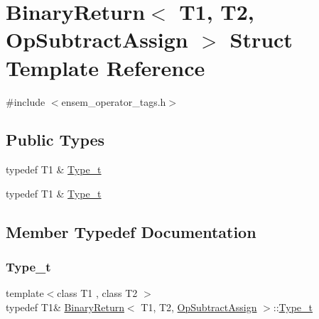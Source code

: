 \hypertarget{structBinaryReturn_3_01T1_00_01T2_00_01OpSubtractAssign_01_4}{}\section{Binary\+Return$<$ T1, T2, Op\+Subtract\+Assign $>$ Struct Template Reference}
\label{structBinaryReturn_3_01T1_00_01T2_00_01OpSubtractAssign_01_4}


{\ttfamily \#include $<$ensem\+\_\+operator\+\_\+tags.\+h$>$}

\subsection*{Public Types}
\begin{DoxyCompactItemize}
\item 
typedef T1 \& \mbox{\hyperlink{structBinaryReturn_3_01T1_00_01T2_00_01OpSubtractAssign_01_4_a93357e4d56f953a4f58fec3320ba9db3}{Type\+\_\+t}}
\item 
typedef T1 \& \mbox{\hyperlink{structBinaryReturn_3_01T1_00_01T2_00_01OpSubtractAssign_01_4_a93357e4d56f953a4f58fec3320ba9db3}{Type\+\_\+t}}
\end{DoxyCompactItemize}


\subsection{Member Typedef Documentation}
\mbox{\label{structBinaryReturn_3_01T1_00_01T2_00_01OpSubtractAssign_01_4_a93357e4d56f953a4f58fec3320ba9db3}} 
\subsubsection{\texorpdfstring{Type\_t}{Type\_t}\hspace{0.1cm}{\footnotesize\ttfamily [1/2]}}
{\footnotesize\ttfamily template$<$class T1 , class T2 $>$ \\
typedef T1\& \mbox{\hyperlink{structBinaryReturn}{Binary\+Return}}$<$ T1, T2, \mbox{\hyperlink{structOpSubtractAssign}{Op\+Subtract\+Assign}} $>$\+::\mbox{\hyperlink{structBinaryReturn_3_01T1_00_01T2_00_01OpSubtractAssign_01_4_a93357e4d56f953a4f58fec3320ba9db3}{Type\+\_\+t}}}

